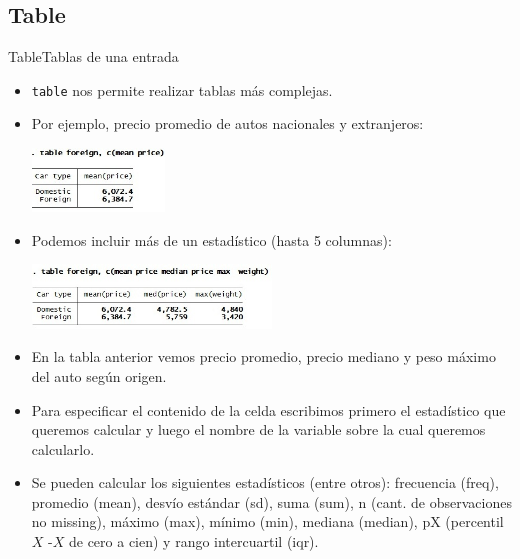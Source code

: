 \documentclass{beamer}
\begin{document}
\subsection{Table}
\begin{frame}[allowframebreaks]{Table}{Tablas de una entrada}
\begin{itemize}
\item \texttt{table} nos permite realizar tablas más complejas.
\item Por ejemplo, precio promedio de autos nacionales y extranjeros:
\medskip
\centerline{\includegraphics[height=1.7cm]{table.jpg}}
\item Podemos incluir más de un estadístico (hasta 5 columnas): 
\medskip
\centerline{\includegraphics[height=1.7cm]{table4.jpg}}
\item En la tabla anterior vemos precio promedio, precio mediano y peso máximo del auto según origen. 
\item Para especificar el contenido de la celda escribimos primero el estadístico que queremos calcular y luego el nombre de la variable sobre la cual queremos calcularlo.
\item Se pueden calcular los siguientes estadísticos (entre otros): frecuencia (freq), promedio (mean), desvío estándar (sd), suma (sum), n (cant. de observaciones no missing), máximo (max), mínimo (min), mediana (median), pX (percentil $X$ -$X$ de cero a cien) y rango intercuartil (iqr). 
\end{itemize}
\end{frame}
\end{document}
